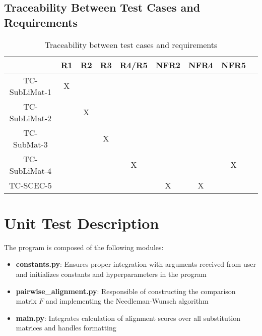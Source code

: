 \documentclass[12pt, titlepage]{article}
\begin{document}
\newpage
\subsection{Traceability Between Test Cases and Requirements}

\begin{table}[h]
  \centering
  \begin{tabular}{|c|c|c|c|c|c|c|c|c|}
  \hline
   & R1 & R2 & R3 & R4/R5 & NFR2 & NFR4 & NFR5 \\
  \hline
  TC-SubLiMat-1 & X &   &   &   &   &   &   \\
  \hline
  TC-SubLiMat-2 &   & X &   &   &   &   &   \\
  \hline
  TC-SubMat-3   &   &   & X &   &   &   &   \\
  \hline
  TC-SubLiMat-4 &   &   &   & X &   &   & X \\
  \hline
  TC-SCEC-5     &   &   &   &   & X & X &   \\
  \hline
  \end{tabular}
  \caption{Traceability between test cases and requirements}
  \label{tab:traceability}
\end{table}

\section{Unit Test Description}\label{unittd:main}

The program \progname{} is composed of the following modules:

\begin{itemize}
  \item \textbf{constants.py}: Ensures proper integration with arguments received from user and initializes constants and hyperparameters in the program
  \item \textbf{pairwise\_alignment.py}: Responsible of constructing the comparison matrix $F$ and implementing the Needleman-Wunsch algorithm
  \item \textbf{main.py}: Integrates calculation of alignment scores over all substitution matrices and handles formatting
  \end{itemize}
  


\end{document}
